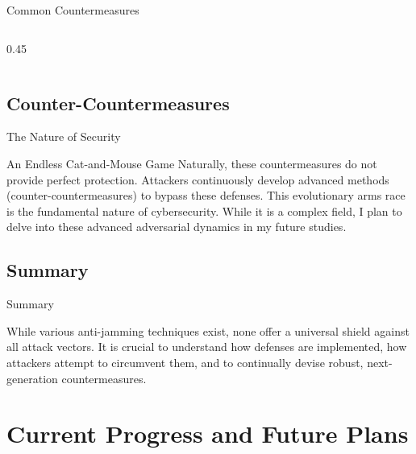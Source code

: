 \documentclass[11pt, aspectratio=169]{beamer}
\begin{document}
\begin{frame}{Common Countermeasures}
\begin{columns}[c]
\begin{column}{0.45\textwidth}
    \end{column}
    
  \end{columns}
\end{frame}

\subsection{Counter-Countermeasures}

\begin{frame}{The Nature of Security}
  \begin{block}{An Endless Cat-and-Mouse Game}
    Naturally, these countermeasures do not provide perfect protection. Attackers continuously develop advanced methods (counter-countermeasures) to bypass these defenses. This evolutionary arms race is the fundamental nature of cybersecurity. While it is a complex field, I plan to delve into these advanced adversarial dynamics in my future studies.
  \end{block}
\end{frame}

\subsection{Summary}

\begin{frame}{Summary}
  \begin{block}{}
    While various anti-jamming techniques exist, none offer a universal shield against all attack vectors. It is crucial to understand how defenses are implemented, how attackers attempt to circumvent them, and to continually devise robust, next-generation countermeasures.
  \end{block}
\end{frame}

\section{Current Progress and Future Plans}
\end{document}
